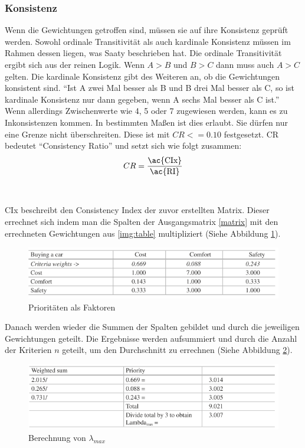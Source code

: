 \subsubsection{Konsistenz}
Wenn die Gewichtungen getroffen sind, müssen sie auf ihre Konsistenz geprüft werden.\autocite[Vgl.][S.13]{Mu.2018} Sowohl ordinale Transitivität als auch kardinale Konsistenz müssen im Rahmen dessen liegen, was Saaty beschrieben hat.\autocite[Vgl.][S.107]{Fink.2006} Die ordinale Transitivität ergibt sich aus der reinen Logik. Wenn $A > B$ und $B > C$ dann muss auch $A > C$ gelten.\autocite[Vgl.][S.108]{Fink.2006} Die kardinale Konsistenz gibt des Weiteren an, ob die Gewichtungen konsistent sind. \enquote{Ist A zwei Mal besser als B und B drei Mal besser als C, so ist kardinale Konsistenz nur dann gegeben, wenn A sechs Mal besser als C ist.}\autocite[S.107]{Fink.2006} Wenn allerdings Zwischenwerte wie 4, 5 oder 7 zugewiesen werden, kann es zu Inkonsistenzen kommen. In bestimmten Maßen ist dies erlaubt. Sie dürfen nur eine Grenze nicht überschreiten.\autocite[Vgl.][S.13]{Mu.2018} Diese ist mit $CR<=0.10$ festgesetzt. CR bedeutet \enquote{Consistency Ratio} und setzt sich wie folgt zusammen:\autocite[Vgl.][S.13]{Mu.2018}\\
\[CR=\frac{\mbox{\ac{CIx}}}{\mbox{\ac{RI}}}\]\\
\\
\ac{CIx} beschreibt den Consistency Index der zuvor erstellten Matrix. Dieser errechnet sich indem man die Spalten der Ausgangsmatrix \ref{matrix} mit den errechneten Gewichtungen aus \ref{img:table} multipliziert (Siehe Abbildung \ref{img:crit}).
\begin{figure}[h!]
	\centering
	\includegraphics[scale = 1]{img/Kriterien.png}
	\caption{Prioritäten als Faktoren}
	\label{img:crit}
\end{figure}
Danach werden wieder die Summen der Spalten gebildet und durch die jeweiligen Gewichtungen geteilt. Die Ergebnisse werden aufsummiert und durch die Anzahl der Kriterien $n$ geteilt, um den Durchschnitt zu errechnen (Siehe Abbildung \ref{img:lambda}).
\begin{figure}[h!]
	\centering
	\includegraphics[scale = 0.9]{img/Lambda.png}
	\caption{Berechnung von $\lambda_{max}$}
	\label{img:lambda}
\end{figure} \\
